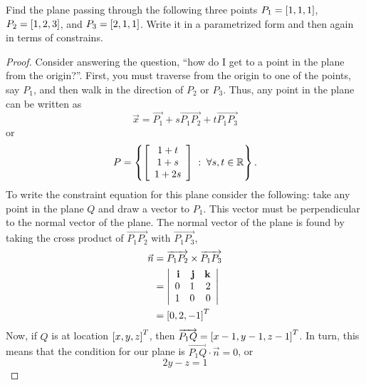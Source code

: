 \documentclass{tutorial}
\begin{document}
\begin{prob} Find the plane passing through the following three points $P_1 = \left[ 1,1,1 \right]$, $P_2 = \left[ 1,2,3 \right]$, and $P_3 = \left[ 2,1,1 \right]$. Write it in a parametrized form and then again in terms of constrains.
\end{prob} \ifsolns \begin{proof}
Consider answering the question, ``how do I get to a point in the plane from the origin?''. First, you must traverse from the origin to one of the points, say $P_1$, and then walk in the direction of $P_2$ or $P_3$. Thus, any point in the plane can be written as
\[
  \vec{x} = \overrightarrow{P_1} + s \overrightarrow{P_1P_2} + t \overrightarrow{P_1P_3}
\]
or
\[
  P = \left\{ \left[ \begin{array}{c} 1 + t \\ 1+s \\ 1+2s \end{array} \right] \; : \; \forall s,t \in \mathbb{R} \right\} .
\]
To write the constraint equation for this plane consider the following: take any point in the plane $Q$ and draw a vector to $P_1$. This vector must be perpendicular to the normal vector of the plane. The normal vector of the plane is found by taking the cross product of $\overrightarrow{P_1P_2}$ with $\overrightarrow{P_1P_3}$,
\begin{align*}
  \vec{n}
  & = \overrightarrow{P_1P_2} \times \overrightarrow{P_1P_3} \\
  & = \left| \begin{array}{rrr}
    \mathbf{i} & \mathbf{j} & \mathbf{k} \\
    0 & 1 & 2 \\
    1 & 0 & 0
  \end{array} \right| \\
  & = \left[ 0, 2, -1 \right]^T
\end{align*}
Now, if $Q$ is at location $\left[ x, y, z \right]^T$, then $\overrightarrow{P_1Q} = \left[ x-1, y-1, z-1 \right]^T$. In turn, this means that the condition for our plane is $\overrightarrow{P_1Q} \cdot \vec{n} = 0$, or
\[
  2y - z = 1
\]
\end{proof}\else \vspace{4in} \fi
\end{document}
